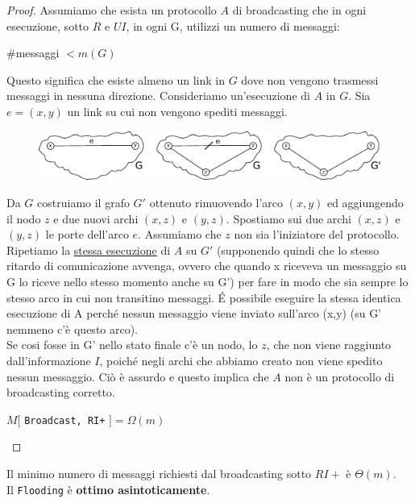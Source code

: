 \begin{proof}
    Assumiamo che esista un protocollo $A$ di broadcasting che in ogni
    esecuzione, sotto $R$ e $UI$, in ogni G, utilizzi un numero di messaggi:

    \begin{center}
        \#messaggi $< m(G)$
    \end{center}

    Questo significa che esiste almeno un link in $G$ dove non vengono trasmessi
    messaggi in nessuna direzione. Consideriamo un'esecuzione di $A$ in $G$. Sia
    $e=(x, y)$ un link su cui non vengono spediti messaggi.

    \begin{figure}[H]
        \centering
        \includegraphics[width=13cm, keepaspectratio]{images/n_09}
    \end{figure}

    Da $G$ costruiamo il grafo $G'$ ottenuto rimuovendo l'arco $(x, y)$ ed
    aggiungendo il nodo $z$ e due nuovi archi $(x, z)$ e $(y, z)$. Spostiamo sui
    due archi $(x, z)$ e $(y, z)$ le porte dell'arco $e$. Assumiamo che   $z$
    non sia l'iniziatore del protocollo. Ripetiamo la \underline{stessa
        esecuzione} di $A$ su $G'$ (supponendo quindi che lo stesso ritardo di
    comunicazione avvenga, ovvero che quando x riceveva un messaggio su G lo
    riceve nello stesso momento anche su G') per fare in modo che sia sempre lo
    stesso arco in cui non transitino messaggi. \'E possibile eseguire la stessa
    identica esecuzione di A perché nessun messaggio viene inviato sull'arco
    (x,y) (su G' nemmeno c'è questo arco).\\
    Se cosi fosse in G' nello stato finale c'è un nodo, lo $z$, che non viene
    raggiunto dall'informazione $I$, poiché negli archi che abbiamo creato non
    viene spedito nessun messaggio. Ciò è assurdo e questo implica che $A$ non è
    un protocollo di broadcasting corretto.

    \begin{center}
        $M[$ \texttt{Broadcast, RI+} $] = \Omega(m)$
    \end{center}

\end{proof}

\begin{theorem}
    Il minimo numero di messaggi richiesti dal broadcasting sotto $RI+$
    è $\Theta(m)$. \\ Il \texttt{Flooding} è \textbf{ottimo asintoticamente}.
\end{theorem}

